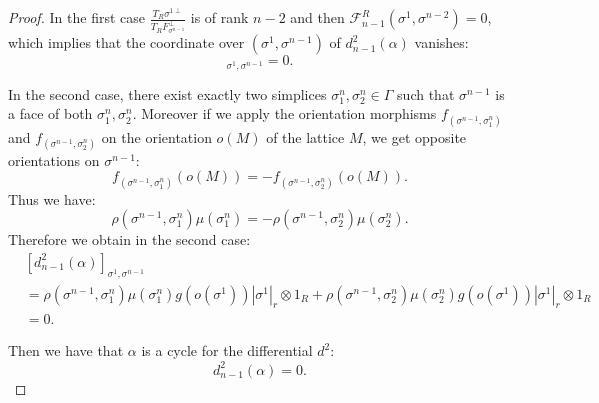 \documentclass{article}
\begin{document}
\begin{proof}
    In the first case $\frac{T_{R}\sigma^{1\perp}}{T_{R}F_{\sigma^{n-1}}^{\perp}}$ is of rank $n-2$ and then $\mathcal{F}_{n-1}^{R}(\sigma^1,\sigma^{n-2}) = 0$, which implies that the coordinate over $(\sigma^1,\sigma^{n-1})$ of $d^{2}_{n-1}(\alpha)$ vanishes:
    \begin{equation*}
        [d^{2}_{n-1}(\alpha)]_{\sigma^1,\sigma^{n-1}} = 0 .
    \end{equation*}

    In the second case, there exist exactly two simplices $\sigma^n_1,\sigma^n_2 \in \Gamma$ such that $\sigma^{n-1}$ is a face of both $\sigma^n_1,\sigma^n_2$. Moreover if we apply the orientation morphisms $f_{(\sigma^{n-1},\sigma^n_1)}$ and $f_{(\sigma^{n-1},\sigma^n_2)}$ on the orientation $o(M)$ of the lattice $M$, we get opposite orientations on $\sigma^{n-1}$:
    \begin{equation*}
        f_{(\sigma^{n-1},\sigma^n_1)}(o(M)) = - f_{(\sigma^{n-1},\sigma^n_2)}(o(M)) .
    \end{equation*}
    Thus we have:
    \begin{equation*}
        \rho(\sigma^{n-1},\sigma^n_1)\mu(\sigma^n_1) = -\rho(\sigma^{n-1},\sigma^n_2)\mu(\sigma^n_2) .
    \end{equation*}
    Therefore we obtain in the second case:
    \begin{align*}
        &[d^{2}_{n-1}(\alpha)]_{\sigma^1,\sigma^{n-1}} \\ &= \rho(\sigma^{n-1},\sigma^n_1)\mu(\sigma^n_1)g(o(\sigma^1)) |\sigma^1|_r \otimes 1_R + \rho(\sigma^{n-1},\sigma^n_2)\mu(\sigma^n_2)g(o(\sigma^1)) |\sigma^1|_r \otimes 1_R \\ & = 0.
    \end{align*}

    Then we have that $\alpha$ is a cycle for the differential $d^{2}$:
    \begin{equation*}
        d^{2}_{n-1}(\alpha) = 0.
    \end{equation*}


\end{proof}
\end{document}
